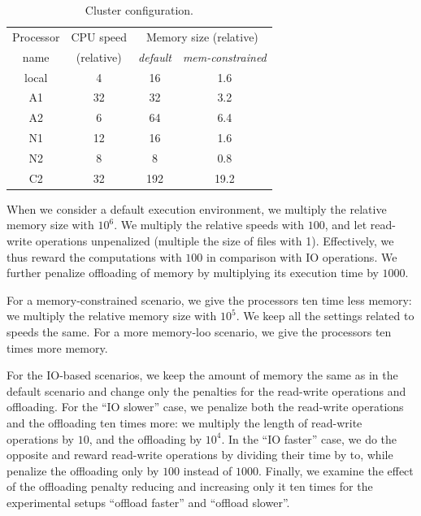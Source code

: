 \documentclass[conference]{IEEEtran}
\begin{document}
    \begin{table}[htb]
        \begin{center}
            \begin{tabular}{c|c|cc}
                \toprule
                Processor  %
                &  CPU speed   & \multicolumn{2}{c}{Memory size (relative)} \\
                name & (relative) & {\em default} & {\em mem-constrained} \\
                \midrule
                local                    & 4                    & 16     & 1.6 \\
                A1                      & 32                   & 32     & 3.2 \\
                A2                      & 6                    & 64    & 6.4 \\
                N1                      & 12                   & 16     & 1.6 \\
                N2                      & 8                    & 8      & 0.8\\
                C2                      & 32                   & 192   &  19.2\\
                \bottomrule
            \end{tabular}
        \end{center}
        \caption{Cluster configuration.}
        \label{tab:procs}
    \end{table}

    When we consider a default execution environment, we multiply the relative memory size with $10^6$.
    We multiply the relative speeds with $100$, and let read-write operations unpenalized (multiple the size of files with 1).
    Effectively, we thus reward the computations with $100$ in comparison  with IO operations.
    We further penalize offloading of memory by multiplying its execution time by $1000$.


    For a memory-constrained scenario, we give the processors ten time less memory: we multiply the relative memory size
    with $10^5$.
    We keep all the settings related to speeds the same.
    For a more memory-loo scenario, we give the processors ten times more memory.

    For the IO-based scenarios, we keep the amount of memory the same as in the default scenario and change only the penalties for the read-write
    operations and offloading.
    For the ``IO slower'' case, we penalize both the read-write operations and the offloading ten times more: we multiply the length of
    read-write operations by $10$, and the offloading by $10^4$.
    In the ``IO faster'' case, we do the opposite and reward read-write operations by dividing their time by to, while penalize the offloading only
    by $100$ instead of $1000$.
    Finally, we examine the effect of the offloading penalty reducing and increasing only it ten times for the experimental setups ``offload faster''
    and ``offload slower''.
\end{document}
